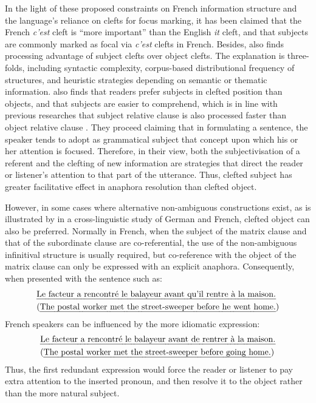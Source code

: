 In the light of these proposed constraints on French information structure and the language's reliance on clefts for focus marking, it has been claimed that the French \emph{c'est} cleft is ``more important'' than the English \emph{it} cleft, and that subjects are commonly marked as focal via \emph{c'est} clefts in French. Besides, \citet{reichle2014} also finds processing advantage of subject clefts over object clefts. The explanation is three-folds, including syntactic complexity, corpus-based distributional frequency of structures, and heuristic strategies depending on semantic or thematic information. \citet{engelkamp1982} also finds that readers prefer subjects in clefted position than objects, and that subjects are easier to comprehend, which is in line with previous researches that subject relative clause is also processed faster than object relative clause \citep{hakes1976}. They proceed claiming that in formulating a sentence, the speaker tends to adopt as grammatical subject that concept upon which his or her attention is focused. Therefore, in their view, both the subjectivisation of a referent and the clefting of new information are strategies that direct the reader or listener's attention to that part of the utterance. Thus, clefted subject has greater facilitative effect in anaphora resolution than clefted object.

However, in some cases where alternative non-ambiguous constructions exist, as is illustrated by \citet{colonna2012} in a cross-linguistic study of German and French, clefted object can also be preferred. Normally in French, when the subject of the matrix clause and that of the subordinate clause are co-referential, the use of the non-ambiguous infinitival structure is usually required, but co-reference with the object of the matrix clause can only be expressed with an explicit anaphora. Consequently, when presented with the sentence such as:
\begin{align}
	&\mbox{\emph{Le facteur a rencontré le balayeur avant qu'il rentre à la maison.}}\\
	\label{facteur}
	&\mbox{(\emph{The postal worker met the street-sweeper before he went home.})}\notag
\end{align}
French speakers can be influenced by the more idiomatic expression:
\begin{align}
	&\mbox{\emph{Le facteur a rencontré le balayeur avant de rentrer à la maison.}}\\
	\label{facteur2}
	&\mbox{(\emph{The postal worker met the street-sweeper before going home.})}\notag
\end{align}
Thus, the first redundant expression would force the reader or listener to pay extra attention to the inserted pronoun, and then resolve it to the object rather than the more natural subject.

